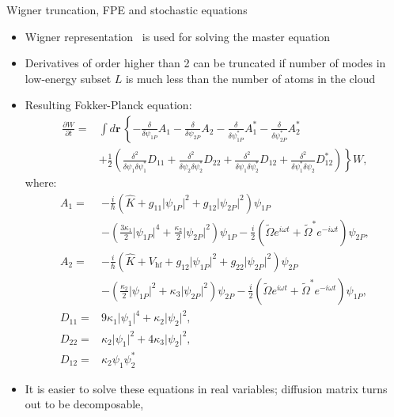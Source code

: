 \documentclass[final,hyperref={pdfpagelabels=false}]{beamer}
\begin{document}
\begin{frame}
\begin{columns}
{\begin{block}{Wigner truncation, FPE and stochastic equations}
\begin{itemize}
	\item Wigner representation~\cite{gardiner} is used for solving the master equation
	\item Derivatives of order higher than 2 can be truncated if number of modes in low-energy subset $L$
		is much less than the number of atoms in the cloud~\cite{norrie}~\cite{sinatra}
	\item Resulting Fokker-Planck equation:
\begin{equation*}
\begin{split}
\frac{\partial W}{\partial t} = & \int d\mathbf{r}\, \left\{
	- \frac{\delta}{\delta \psi_{1P}} A_1 -
	\frac{\delta}{\delta \psi_{2P}} A_2 -
	\frac{\delta}{\delta \psi^*_{1P}} A^*_1 -
	\frac{\delta}{\delta \psi^*_{2P}} A^*_2
\right. \\
& \left. + \frac{1}{2} \left(
	\frac{\delta^2}{\delta \psi_1 \delta \psi_1^*} D_{11} +
	\frac{\delta^2}{\delta \psi_2 \delta \psi_2^*} D_{22} +
	\frac{\delta^2}{\delta \psi_1 \delta \psi_2^*} D_{12} +
	\frac{\delta^2}{\delta \psi_1^* \delta \psi_2} D^*_{12} \right)
\right\} W,
\end{split}
\end{equation*}
where:
\begin{align*}
A_1 = {} & -\frac{i}{\hbar} \left( \hat{K} + g_{11} \lvert \psi_{1P} \rvert^2 + g_{12} \lvert \psi_{2P} \rvert^2 \right) \psi_{1P} \\
	& - \left( \frac{3 \kappa_1}{2} \lvert \psi_{1P} \rvert^4 + \frac{\kappa_2}{2} \lvert \psi_{2P} \rvert^2 \right) \psi_{1P} -
	\frac{i}{2} \left( \tilde{\Omega} e^{i \omega t} + \tilde{\Omega}^* e^{-i \omega t} \right) \psi_{2P}, \\
A_2 = {} & -\frac{i}{\hbar} \left( \hat{K} + V_{\textrm{hf}} +
	g_{12} \lvert \psi_{1P} \rvert^2 + g_{22} \lvert \psi_{2P} \rvert^2 \right) \psi_{2P} \\
	& - \left( \frac{\kappa_2}{2} \lvert \psi_{1P} \rvert^2 + \kappa_3 \lvert \psi_{2P} \rvert^2 \right) \psi_{2P} -
	\frac{i}{2} \left( \tilde{\Omega} e^{i \omega t} + \tilde{\Omega}^* e^{-i \omega t} \right) \psi_{1P}, \\
D_{11} = {} & 9 \kappa_1 \lvert \psi_1 \rvert^4 + \kappa_2 \lvert \psi_2 \rvert^2, \\
D_{22} = {} & \kappa_2 \lvert \psi_1 \rvert^2 + 4 \kappa_3 \lvert \psi_2 \rvert^2, \\
D_{12} = {} & \kappa_2 \psi_1 \psi_2^*
\end{align*}
	\item It is easier to solve these equations in real variables; diffusion matrix turns out to be decomposable,

\end{itemize}
\end{block}}
\end{columns}
\end{frame}
\end{document}
